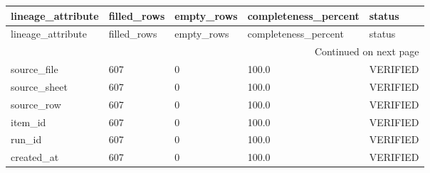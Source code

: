 \begingroup
\scriptsize
\begin{longtable}{lllll}
\toprule
lineage_attribute & filled_rows & empty_rows & completeness_percent & status \\
\midrule
\endfirsthead
\toprule
lineage_attribute & filled_rows & empty_rows & completeness_percent & status \\
\midrule
\endhead
\midrule
\multicolumn{5}{r}{Continued on next page} \\
\midrule
\endfoot
\bottomrule
\endlastfoot
source_file & 607 & 0 & 100.0 & VERIFIED \\
source_sheet & 607 & 0 & 100.0 & VERIFIED \\
source_row & 607 & 0 & 100.0 & VERIFIED \\
item_id & 607 & 0 & 100.0 & VERIFIED \\
run_id & 607 & 0 & 100.0 & VERIFIED \\
created_at & 607 & 0 & 100.0 & VERIFIED \\
\end{longtable}
\endgroup
